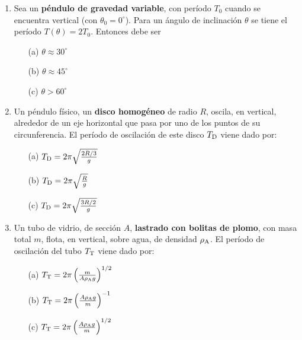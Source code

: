 \documentclass[11pt]{articulo}
\begin{document}
\begin{enumerate}
\item  Sea un {\bf p\'endulo de gravedad variable},  con per\'iodo $T_0$   cuando se encuentra vertical 
(con $\theta_0 = 0^\circ$). Para un   \'angulo de inclinaci\'on $\theta$ se tiene   el per\'iodo $T(\theta)=2T_0$. Entonces debe ser 
\begin{enumerate}
\item[(a)] \fbox{$\, \phantom{-}\, $} \hspace*{1cm}   $\theta \approx 30^\circ$
\item[(b)] \fbox{$\, \phantom{-}\, $} \hspace*{1cm}   $\theta\approx 45^\circ$
\item[(c)] \fbox{$\, \phantom{-}\, $} \hspace*{1cm}   $\theta > 60^\circ$  %
\end{enumerate}

\item  Un p\'endulo f\'isico, un {\bf  disco homog\'eneo} de radio  $R$,  oscila, en vertical, alrededor de un eje horizontal que pasa por uno de los puntos de su circunferencia.  El per\'iodo de oscilaci\'on de este disco   $T_{\rm D}$   viene dado por:
\begin{enumerate}
\item[(a)] \fbox{$\, \phantom{-}\, $} \hspace*{1cm}   $T_{\rm D}=2 \pi \sqrt{2R/3 \over g}$
\item[(b)] \fbox{$\, \phantom{-}\, $} \hspace*{1cm}   $T_{\rm D}=2 \pi \sqrt{R  \over g}$
\item[(c)] \fbox{$\, \phantom{-}\, $} \hspace*{1cm}   $T_{\rm D}=2 \pi \sqrt{3R/2 \over g}$  %
\end{enumerate}

\newpage

\item  Un tubo de vidrio, de secci\'on $A$,  {\bf lastrado con bolitas de plomo}, con masa total $m$,  flota,  en vertical, sobre agua, de densidad $\rho_{\rm A}$.
El per\'iodo de oscilaci\'on del tubo $T_{\rm T}$ viene dado por:
\begin{enumerate}
\item[(a)] \fbox{$\, \phantom{-}\, $} \hspace*{1cm}   $T_{\rm T}=2\pi \left({m \over A \rho_{\rm A} g}\right)^{1/2}$  %
\item[(b)] \fbox{$\, \phantom{-}\, $} \hspace*{1cm}   $T_{\rm T}=2\pi \left({A \rho_{\rm A} g\over m}\right)^{-1}$
\item[(c)] \fbox{$\, \phantom{-}\, $} \hspace*{1cm}   $T_{\rm T}=2\pi \left({A \rho_{\rm A} g\over m}\right)^{1/2}$
\end{enumerate}


\end{enumerate}
\end{document}
